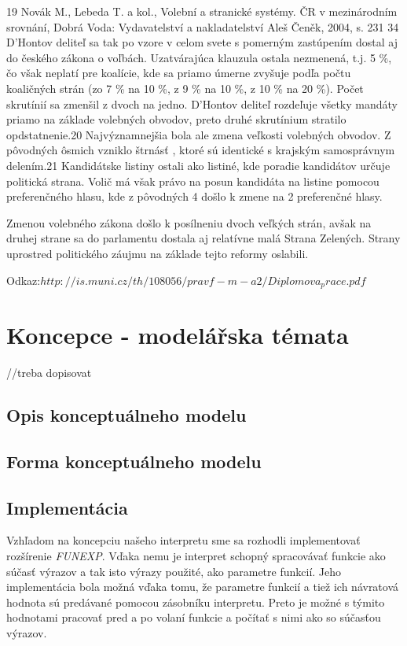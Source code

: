 \documentclass[12pt,a4paper,titlepage,final]{article}
\begin{document}
19
 Novák M., Lebeda T. a kol., Volební a stranické systémy. ČR v mezinárodním srovnání, 
Dobrá Voda: Vydavatelství a nakladatelství Aleš Čeněk, 2004, s. 231 
  34
D'Hontov deliteľ sa tak po vzore v celom svete s pomerným zastúpením 
dostal aj do českého zákona o voľbách. Uzatvárajúca klauzula ostala 
nezmenená, t.j. 5 \%, čo však neplatí pre koalície, kde sa priamo úmerne 
zvyšuje podľa počtu koaličných strán (zo 7 \% na 10 \%, z 9 \% na 10 \%, z 10 
\% na 20 \%). Počet skrutínií sa zmenšil z dvoch na jedno. D'Hontov deliteľ 
rozdeľuje všetky mandáty priamo na základe volebných obvodov, preto 
druhé skrutínium stratilo opdstatnenie.20
 Najvýznamnejšia bola ale zmena 
veľkosti volebných obvodov. Z pôvodných ôsmich vzniklo štrnásť , ktoré sú 
identické s krajským samosprávnym delením.21
 Kandidátske listiny ostali 
ako listiné, kde poradie kandidátov určuje politická strana. Volič má však 
právo na posun kandidáta na listine pomocou preferenčného hlasu, kde 
z pôvodných 4 došlo k zmene na 2 preferenčné hlasy. 
 
Zmenou volebného zákona došlo k posílneniu dvoch veľkých strán, 
avšak na druhej strane sa do parlamentu dostala aj relatívne malá Strana 
Zelených. Strany uprostred politického záujmu na základe tejto reformy 
oslabili. 

Odkaz:$http://is.muni.cz/th/108056/pravf-m-a2/Diplomova_prace.pdf$





\section{Koncepce - modelářska témata}

//treba dopisovat

\subsection{Opis konceptuálneho modelu}


\subsection{Forma konceptuálneho modelu}


\subsection{Implementácia}
Vzhľadom na koncepciu našeho interpretu sme sa rozhodli implementovať rozšírenie \emph{FUNEXP}. Vďaka nemu je interpret schopný spracovávať funkcie ako súčasť výrazov a tak isto výrazy použité, ako parametre funkcií. Jeho implementácia bola možná vďaka tomu, že parametre funkcií a tiež ich návratová hodnota sú predávané pomocou zásobníku interpretu. Preto je možné s týmito hodnotami pracovať pred a po volaní funkcie a počítať s nimi ako so súčasťou výrazov.
\end{document}
